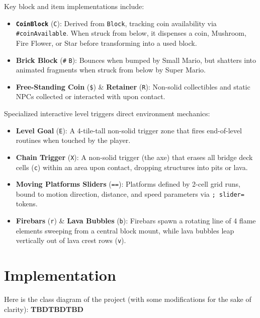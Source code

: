 \documentclass[12pt, a4paper]{article}
\begin{document}
Key block and item implementations include:
\begin{itemize}
\item \textbf{\texttt{CoinBlock}} (\texttt{C}): Derived from \texttt{Block}, tracking coin availability via \texttt{\#coinAvailable}. When struck from below, it dispenses a coin, Mushroom, Fire Flower, or Star before transforming into a used block.
\item \textbf{Brick Block} (\texttt{\#} \/ \texttt{B}): Bounces when bumped by Small Mario, but shatters into animated fragments when struck from below by Super Mario.
\item \textbf{Free-Standing Coin} (\texttt{\$}) \& \textbf{Retainer} (\texttt{R}): Non-solid collectibles and static NPCs collected or interacted with upon contact.
\end{itemize}

Specialized interactive level triggers direct environment mechanics:
\begin{itemize}
\item \textbf{Level Goal} (\texttt{E}): A 4-tile-tall non-solid trigger zone that fires end-of-level routines when touched by the player.
\item \textbf{Chain Trigger} (\texttt{X}): A non-solid trigger (the axe) that erases all bridge deck cells (\texttt{c}) within an area upon contact, dropping structures into pits or lava.
\item \textbf{Moving Platforms \/ Sliders} (\texttt{==}): Platforms defined by 2-cell grid runs, bound to motion direction, distance, and speed parameters via \texttt{; slider=} tokens.
\item \textbf{Firebars} (\texttt{r}) \& \textbf{Lava Bubbles} (\texttt{b}): Firebars spawn a rotating line of 4 flame elements sweeping from a central block mount, while lava bubbles leap vertically out of lava crest rows (\texttt{v}).
\end{itemize}

\newpage

\section{Implementation}

Here is the class diagram of the project (with some modifications for the sake of clarity): \textbf{TBDTBDTBD}
\end{document}

